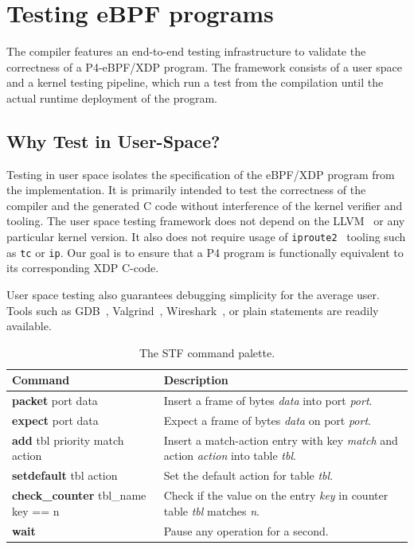 \section{Testing eBPF programs}\label{sec:testing}
The compiler features an end-to-end testing infrastructure to validate the 
correctness of a P4-eBPF/XDP program. The framework consists of a user space 
and a kernel testing pipeline, which run a test from the compilation 
until the actual runtime deployment of the program.

\subsection{Why Test in User-Space?}
Testing in user space isolates the specification of the eBPF/XDP program from 
the implementation. It is primarily intended to test the correctness of the
compiler and the generated C code without interference of the kernel verifier
and tooling. The user space testing framework does not depend on the 
LLVM~\cite{llvm} or any particular kernel version. It also does not require 
usage of \texttt{iproute2}~\cite{iproute} tooling such as \texttt{tc} or 
\texttt{ip}. 
Our goal is to ensure that a P4 program is functionally equivalent to its 
corresponding XDP C-code.

User space testing also guarantees debugging simplicity for the average
user. Tools such as GDB~\cite{gdb}, Valgrind~\cite{valgrind}, 
Wireshark~\cite{wireshark}, or plain statements
are readily available.



\begin{table}[h]
	\begin{center}
		\begin{tabular}{|l|p{9cm}|} \hline
			\textbf{Command} & \textbf{Description} \\ \hline \hline
			\textbf{packet} port data & Insert a frame of bytes
			\textit{data} into port \textit{port}.    \\ \hline
			\textbf{expect} port data & Expect a frame of bytes
			\textit{data} on port \textit{port}.  \\ \hline
			\textbf{add} tbl priority match action & Insert a
			match-action entry with key \textit{match} and action
			\textit{action} into table \textit{tbl}. \\ \hline
			\textbf{setdefault} tbl action & Set the default action for table
			\textit{tbl}. \\
			\hline
			\textbf{check\_counter} tbl\_name key == n & Check if the value on
			the entry \textit{key} in counter table \textit{tbl} matches
			\textit{n}.  \\
			\hline
			\textbf{wait} & Pause any operation for a second. \\ \hline
		\end{tabular}
		\caption{The STF command palette.}\label{table:stf}
	\end{center}
\end{table}

